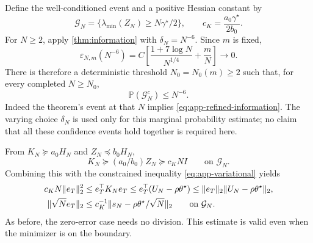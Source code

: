 \documentclass[10pt,twoside,letterpaper]{article}
\newcommand{\Prob}{\mathbb P}
\newcommand{\norm}[1]{\lVert #1\rVert}
\begin{document}
Define the well-conditioned event and a positive Hessian constant by
\begin{equation}
\mathcal G_N=\{\lambda_{\min}(Z_N)\ge N\gamma^\star/2\},
\qquad c_K=\frac{a_0\gamma^\star}{2b_0}.
\label{eq:app-good-event}
\end{equation}
For $N\ge2$, apply \cref{thm:information} with
$\delta_N=N^{-6}$. Since $m$ is fixed,
\begin{equation}
\varepsilon_{N,m}(N^{-6})
=C\left[\frac{1+7\log N}{N^{1/4}}+\frac mN\right]\to0.
\label{eq:app-polynomial-confidence}
\end{equation}
There is therefore a deterministic threshold $N_0=N_0(m)\ge2$ such
that, for every completed $N\ge N_0$,
\begin{equation}
\Prob(\mathcal G_N^c)\le N^{-6}.
\label{eq:app-rare-information}
\end{equation}
Indeed the theorem's event at that $N$ implies
\eqref{eq:app-refined-information}. The varying choice $\delta_N$
is used only for this marginal probability estimate; no claim that
all these confidence events hold together is required here.

From $K_N\succeq a_0H_N$ and $Z_N\preceq b_0H_N$,
\begin{equation}
K_N\succeq(a_0/b_0)Z_N\succeq c_KNI
\qquad\text{on }\mathcal G_N.
\label{eq:app-good-hessian}
\end{equation}
Combining this with the constrained inequality
\eqref{eq:app-variational} yields
\begin{align}
c_KN\norm{e_T}_2^2
&\le e_T^\top K_Ne_T
\le e_T^\top(U_N-\rho\theta^\star)
\le\norm{e_T}_2\norm{U_N-\rho\theta^\star}_2,\notag\\
\norm{\sqrt N e_T}_2
&\le c_K^{-1}\norm{s_N-\rho\theta^\star/\sqrt N}_2
\qquad\text{on }\mathcal G_N.
\label{eq:app-euclidean-score-bound}
\end{align}
As before, the zero-error case needs no division. This estimate is
valid even when the minimizer is on the boundary.
\end{document}
